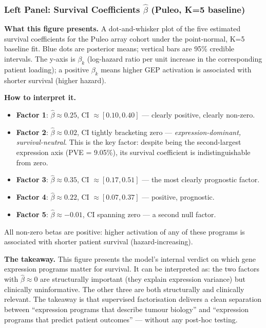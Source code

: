 \documentclass[11pt]{article}
\begin{document}
\subsubsection*{Left Panel: Survival Coefficients $\hat{\beta}$ (Puleo, K=5 baseline)}

\textbf{What this figure presents.} A dot-and-whisker plot of the five estimated survival coefficients for the Puleo array cohort under the point-normal, K=5 baseline fit. Blue dots are posterior means; vertical bars are 95\% credible intervals. The y-axis is $\beta_k$ (log-hazard ratio per unit increase in the corresponding patient loading); a positive $\beta_k$ means higher GEP activation is associated with shorter survival (higher hazard).

\textbf{How to interpret it.}
\begin{itemize}
  \item \textbf{Factor 1}: $\hat{\beta} \approx 0.25$, CI $\approx [0.10, 0.40]$ --- clearly positive, clearly non-zero.
  \item \textbf{Factor 2}: $\hat{\beta} \approx 0.02$, CI tightly bracketing zero --- \emph{expression-dominant, survival-neutral}. This is the key factor: despite being the second-largest expression axis (PVE = 9.05\%), its survival coefficient is indistinguishable from zero.
  \item \textbf{Factor 3}: $\hat{\beta} \approx 0.35$, CI $\approx [0.17, 0.51]$ --- the most clearly prognostic factor.
  \item \textbf{Factor 4}: $\hat{\beta} \approx 0.22$, CI $\approx [0.07, 0.37]$ --- positive, prognostic.
  \item \textbf{Factor 5}: $\hat{\beta} \approx -0.01$, CI spanning zero --- a second null factor.
\end{itemize}
All non-zero betas are positive: higher activation of any of these programs is associated with shorter patient survival (hazard-increasing).

\textbf{The takeaway.} This figure presents the model's internal verdict on which gene expression programs matter for survival. It can be interpreted as: the two factors with $\hat{\beta} \approx 0$ are structurally important (they explain expression variance) but clinically uninformative. The other three are both structurally and clinically relevant. The takeaway is that supervised factorisation delivers a clean separation between ``expression programs that describe tumour biology'' and ``expression programs that predict patient outcomes'' --- without any post-hoc testing.
\end{document}
